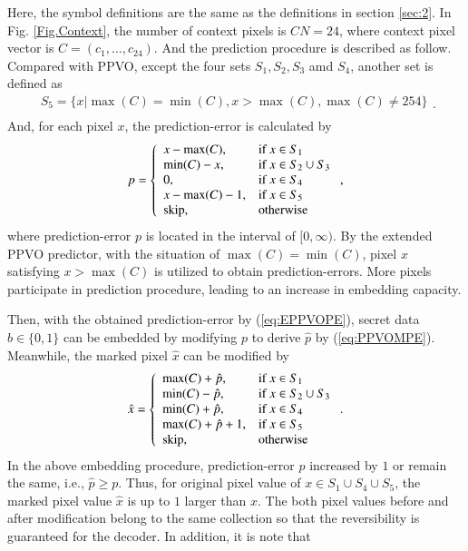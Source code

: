 \documentclass[review,3p,10pt,sort&compress]{elsarticle}
\begin{document}
Here, the symbol definitions are the same as the definitions in section \ref{sec:2}. In Fig. \ref{Fig.Context}, the number of context pixels is $CN = 24$, where context pixel vector is $C = (c_{1}, ..., c_{24})$. And the prediction procedure is described as follow. Compared with PPVO, except the four sets $S_1, S_2, S_3$ amd $S_4$, another set is defined as
\begin{equation*}\label{eq:S_5}
\begin{array}{ll}
S_5 = \{ x | \max(C)   =  \min(C), x > \max(C), \max(C)   \neq  254 \} \\
\end{array}.
\end{equation*}
And, for each pixel $x$, the prediction-error is calculated by
\begin{equation}\label{eq:EPPVOPE}
p = \left\{\begin{array}{ll}
x - \max(C),    & \text{if } x \in S_1  \\
\min(C) - x,    & \text{if } x \in S_2 \cup S_3 \\
0,              & \text{if } x \in S_4 \\
x - \max(C) - 1,& \text{if } x \in S_5  \\
{\rm skip},     & \text{otherwise}
\end{array}\right.,
\end{equation}
where prediction-error $p$ is located in the interval of $[0, \infty)$. By the extended PPVO predictor, with the situation of $\max(C) = \min(C)$, pixel $x$ satisfying $x > \max(C)$ is utilized to obtain prediction-errors. More pixels participate in prediction procedure, leading to an increase in embedding capacity.

Then, with the obtained prediction-error by (\ref{eq:EPPVOPE}), secret data $b \in \{0, 1\}$ can be embedded by modifying $p$ to derive $\hat{p}$ by (\ref{eq:PPVOMPE}). Meanwhile, the marked pixel $\hat{x}$ can be modified by
\begin{equation}\label{eq:Embed}
\hat{x} = \left\{\begin{array}{ll}
\max(C) + \hat{p},    & \text{if } x \in S_1\\
\min(C) - \hat{p},    & \text{if } x \in S_2 \cup S_3 \\
\min(C) + \hat{p},    & \text{if } x \in S_4 \\
\max(C) + \hat{p} + 1,& \text{if } x \in S_5  \\
{\rm skip},     & \text{otherwise}
\end{array}\right..
\end{equation}
In the above embedding procedure, prediction-error $p$ increased by $1$ or remain the same, i.e., $\hat{p} \geq p$. Thus, for original pixel value of $x \in S_1 \cup S_4 \cup S_5$, the marked pixel value $\hat{x}$ is up to $1$ larger than $x$. The both pixel values before and after modification belong to the same collection so that the reversibility is guaranteed for the decoder. In addition, it is note that
\end{document}
